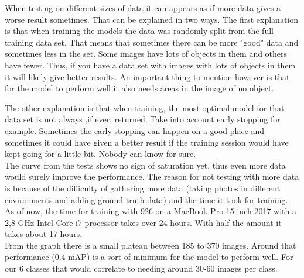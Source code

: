 When testing on different sizes of data it can appears as if more data gives a worse
result sometimes. That can be explained in two ways. The first explanation is that when
training the models the data was randomly split from the full training data set. That 
means that sometimes there can be more "good" data and sometimes less in the set.
Some images have lots of objects in them and others have fewer. Thus, if you have a
data set with images with lots of objects in them it will likely give better results.
An important thing to mention however is that for the model to perform well it also needs
areas in the image of no object.

The other explanation is that when training, the most optimal model for that data set is
not always ,if ever, returned. Take into account early stopping for example.
Sometimes the early stopping can happen on a good place and sometimes it could have
given a better result if the training session would have kept going for a little bit.
Nobody can know for sure. \\

The curve from the tests shows no sign of saturation yet, thus even more data would
surely improve the performance. The reason for not testing with more data is because
of the difficulty of gathering more data (taking photos in different environments and 
adding ground truth data) and the time it took for training.
As of now, the time for training with 926 on a MacBook Pro 15 inch 2017 with a 2,8 GHz
Intel Core i7 processor takes over 24 hours. With half the amount it takes about 17 hours.\\

From the graph there is a small plateau between 185 to 370 images. Around that
performance (0.4 mAP) is a sort of minimum for the model to perform well.
For our 6 classes that would correlate to needing around 30-60 images per class.

\newpage
